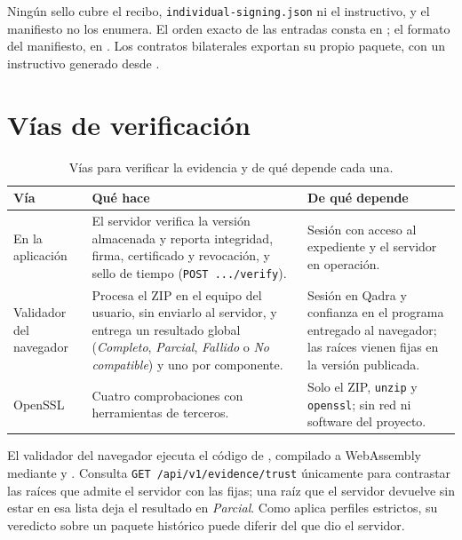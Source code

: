 Ningún sello cubre el recibo, \texttt{individual-signing.json} ni el
instructivo, y el manifiesto no los enumera. El orden exacto de las
entradas consta en ; el formato del manifiesto,
en . Los
contratos bilaterales exportan su propio paquete, con un instructivo
generado desde
.

\section{Vías de verificación}\label{sec:ver-vias}

\begin{table}[H]
  \centering
  \caption{Vías para verificar la evidencia y de qué depende cada una.}
  \label{tab:ver-vias}
  \begin{tabularx}{\textwidth}{L{3.1cm} Y Y}
    \toprule
    \textbf{Vía} & \textbf{Qué hace} & \textbf{De qué depende} \\
    \midrule
    En la aplicación
      & El servidor verifica la versión almacenada y reporta integridad,
        firma, certificado y revocación, y sello de tiempo
        (\texttt{POST .../verify}).
      & Sesión con acceso al expediente y el servidor en operación. \\
    Validador del navegador
      & Procesa el ZIP en el equipo del usuario, sin enviarlo al
        servidor, y entrega un resultado global (\emph{Completo},
        \emph{Parcial}, \emph{Fallido} o \emph{No compatible}) y uno por
        componente.
      & Sesión en Qadra y confianza en el programa entregado al
        navegador; las raíces vienen fijas en la versión publicada. \\
    OpenSSL
      & Cuatro comprobaciones con herramientas de terceros.
      & Solo el ZIP, \texttt{unzip} y \texttt{openssl}; sin red ni
        software del proyecto. \\
    \bottomrule
  \end{tabularx}
\end{table}

El validador del navegador ejecuta el código de
, compilado a WebAssembly mediante
 y
. Consulta
\texttt{GET /api/v1/evidence/trust} únicamente para contrastar las raíces
que admite el servidor con las fijas; una raíz que el servidor devuelve
sin estar en esa lista deja el resultado en \emph{Parcial}. Como aplica
perfiles estrictos, su veredicto sobre un paquete histórico puede diferir
del que dio el servidor.

